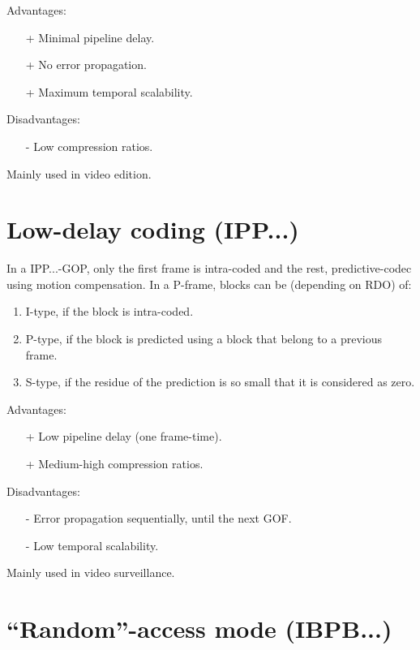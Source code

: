 Advantages:
\begin{itemize}
\item [+] Minimal pipeline delay.
\item [+] No error propagation.
\item [+] Maximum temporal scalability.
\end{itemize}

Disadvantages:
\begin{enumerate}
\item [-] Low compression ratios.
\end{enumerate}

Mainly used in video edition.

\section{Low-delay coding (IPP...)}

In a IPP...-GOP, only the first frame is intra-coded and the rest,
predictive-codec using motion compensation. In a P-frame, blocks can
be (depending on RDO) of:
\begin{enumerate}
\item I-type, if the block is intra-coded.
\item P-type, if the block is predicted using a block that belong to a previous frame.
\item S-type, if the residue of the prediction is so small that it is considered as zero.
\end{enumerate}

Advantages:
\begin{itemize}
\item [+] Low pipeline delay (one frame-time).
\item [+] Medium-high compression ratios.
\end{itemize}

Disadvantages:
\begin{enumerate}
\item [-] Error propagation sequentially, until the next GOF.
\item [-] Low temporal scalability.
\end{enumerate}

Mainly used in video surveillance.

\section{``Random''-access mode (IBPB...)}
\label{sec:random}

